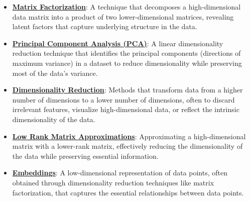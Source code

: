 \documentclass{article}%
\begin{document}
\begin{itemize}[leftmargin=*]%
\item \href{https://purdue.brightspace.com/d2l/common/assets/pdfjs-d2l-dist/1.0.14-legacy/web/viewer.html?file=\%2Fcontent\%2Fenforced\%2F1095467-wl.202510.CS.24300.001\%2F11L2-svd-pca-recommender.pdf\%3Fou\%3D1095467\&lang=en-us\&container=d2l-fileviewer-rendered-pdf\&fullscreen=d2l-fileviewer-rendered-pdf-dialog\&height=667#page=2}{\textbf{Matrix Factorization}}: A technique that decomposes a high-dimensional data matrix into a product of two lower-dimensional matrices, revealing latent factors that capture underlying structure in the data.%
\item \href{https://purdue.brightspace.com/d2l/common/assets/pdfjs-d2l-dist/1.0.14-legacy/web/viewer.html?file=\%2Fcontent\%2Fenforced\%2F1095467-wl.202510.CS.24300.001\%2F11L2-svd-pca-recommender.pdf\%3Fou\%3D1095467\&lang=en-us\&container=d2l-fileviewer-rendered-pdf\&fullscreen=d2l-fileviewer-rendered-pdf-dialog\&height=667#page=15}{\textbf{Principal Component Analysis (PCA)}}: A linear dimensionality reduction technique that identifies the principal components (directions of maximum variance) in a dataset to reduce dimensionality while preserving most of the data's variance.%
\item \href{https://purdue.brightspace.com/d2l/common/assets/pdfjs-d2l-dist/1.0.14-legacy/web/viewer.html?file=\%2Fcontent\%2Fenforced\%2F1095467-wl.202510.CS.24300.001\%2F11L2-svd-pca-recommender.pdf\%3Fou\%3D1095467\&lang=en-us\&container=d2l-fileviewer-rendered-pdf\&fullscreen=d2l-fileviewer-rendered-pdf-dialog\&height=667#page=8}{\textbf{Dimensionality Reduction}}: Methods that transform data from a higher number of dimensions to a lower number of dimensions, often to discard irrelevant features, visualize high-dimensional data, or reflect the intrinsic dimensionality of the data.%
\item \href{https://purdue.brightspace.com/d2l/common/assets/pdfjs-d2l-dist/1.0.14-legacy/web/viewer.html?file=\%2Fcontent\%2Fenforced\%2F1095467-wl.202510.CS.24300.001\%2F11L2-svd-pca-recommender.pdf\%3Fou\%3D1095467\&lang=en-us\&container=d2l-fileviewer-rendered-pdf\&fullscreen=d2l-fileviewer-rendered-pdf-dialog\&height=667#page=9}{\textbf{Low Rank Matrix Approximations}}: Approximating a high-dimensional matrix with a lower-rank matrix, effectively reducing the dimensionality of the data while preserving essential information.%
\item \href{https://purdue.brightspace.com/d2l/common/assets/pdfjs-d2l-dist/1.0.14-legacy/web/viewer.html?file=\%2Fcontent\%2Fenforced\%2F1095467-wl.202510.CS.24300.001\%2F11L2-svd-pca-recommender.pdf\%3Fou\%3D1095467\&lang=en-us\&container=d2l-fileviewer-rendered-pdf\&fullscreen=d2l-fileviewer-rendered-pdf-dialog\&height=667#page=5}{\textbf{Embeddings}}: A low-dimensional representation of data points, often obtained through dimensionality reduction techniques like matrix factorization, that captures the essential relationships between data points.%

\end{itemize}
\end{document}
